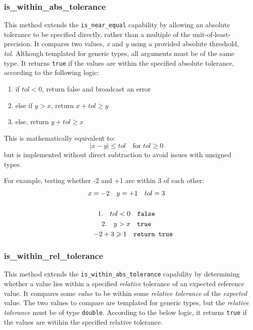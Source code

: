 \documentclass[11pt,fleqn]{report}
\begin{document}
\subsubsection{is\_within\_abs\_tolerance}
This method extends the \texttt{is\_near\_equal} capability 
by allowing an absolute tolerance to be specified directly, rather 
than a multiple of the unit-of-least-precision. It compares two values, \textit{x} 
and \textit{y} using a provided absolute threshold, \textit{tol}. Although templated 
for generic types, all arguments must be of the same type. It returns \texttt{true} if
the values are within the specified absolute tolerance, 
according to the following logic:
\begin{enumerate}
\item if $tol < 0$, return false and broadcast an error
\item else if $y>x$, return {$x+tol \geqslant y$}
\item else, return {$y+tol \geqslant x$}
\end{enumerate}

This is mathematically equivalent to:
\[
|x - y| \le tol \quad \text{for } tol \ge 0
\]
but is implemented without direct subtraction to avoid issues with unsigned
types.

For example, testing whether -2 and +1 are within 3 of each other:
\begin{multline*}
x=-2 \quad y=+1 \quad tol=3 \\\\
\text{1.} \quad tol < 0 \quad \texttt{false} \\
\text{2.} \quad y > x \quad \texttt{true} \\
\qquad -2 + 3 \geqslant 1 \quad \texttt{return true} \hfill
\end{multline*}

\subsubsection{is\_within\_rel\_tolerance}
This method extends the \texttt{is\_within\_abs\_tolerance} capability by 
determining whether a value lies within a specified \textit{relative}
tolerance of an expected reference value. It compares some \textit{value} to be within
some \textit{relative tolerance} of the \textit{expected} value. 
The two values to compare are templated for generic types, but the 
\textit{relative tolerance} must be of type \texttt{double}. According to the below logic,
it returns \texttt{true} if the values are witihin the specified relative tolerance.
\end{document}
